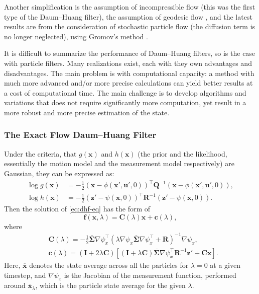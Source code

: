 Another simplification is the assumption of incompressible flow \cite{Daum2007}  (this was the first type of the Daum--Huang filter), the assumption of geodesic flow \cite{Daum2013}, and the latest results are from the consideration of stochastic particle flow (the diffusion term is no longer neglected), using Gromov's method \cite{Daum2018,Dai2021}.

It is difficult to summarize the performance of Daum--Huang filters, so is the case with particle filters. Many realizations exist, each with they own advantages and disadvantages. The main problem is with computational capacity: a method with much more advanced and/or more precise calculations can yield better results at a cost of computational time. The main challenge is to develop algorithms and variations that does not require significantly more computation, yet result in a more robust and more precise estimation of the state.

\subsubsection{The Exact Flow Daum--Huang Filter}

Under the criteria, that $g(\mathbf{x})$ and $h(\mathbf{x})$ (the prior and the likelihood, essentially the motion model and the measurement model respectively) are Gaussian,
they can be expressed as:
\begin{align}
  \log g(\mathbf{x}) & =-\frac{1}{2}(\mathbf{x}-\phi(\mathbf{x}',\mathbf{u}',0))^{\top} \mathbf{Q}^{-1}(\mathbf{x}-\phi(\mathbf{x}',\mathbf{u}',0)),            \\
  \log h(\mathbf{x}) & =-\frac{1}{2}(\mathbf{z}'-\psi(\mathbf{x},0))^{\top} \mathbf{R}^{-1}(\mathbf{z}'-\psi(\mathbf{x},0)). \label{eq:explicit-log-likelihood}
\end{align}
Then the solution of \eqref{eq:dhf-eq} has the form of
\begin{equation}\label{eq:edh-flow-vector}
  \mathbf{f}(\mathbf{x},\lambda) = \mathbf{C}(\lambda)\mathbf{x} + \mathbf{c}(\lambda),
\end{equation}
where
\begin{align}
   & \mathbf{C}(\lambda) = -\frac{1}{2}\mathbf{\mathbf{\overline\Sigma}}\nabla \psi_x^\top\left(\lambda \nabla \psi_x\mathbf{\overline\Sigma}\nabla \psi_x^\top + \mathbf{R}\right)^{-1}\nabla \psi_x,\label{eq:edh-C}                              \\
   & \mathbf{c}(\lambda) = \left(\mathbf{I}+2\lambda\mathbf{C}\right)\left[\left(\mathbf{I}+\lambda\mathbf{C}\right)\mathbf{\overline\Sigma}\nabla \psi_x^\top\mathbf{R}^{-1}\mathbf{z}' + \mathbf{C}\overline{\mathbf{x}}\right]. \label{eq:edh-c}
\end{align}
Here, $\overline{\mathbf{x}}$ denotes the state average across all the particles for $\lambda = 0$ at a given timestep,
and $\nabla \psi_x$ is the Jacobian of the measurement function, performed around $\overline{\mathbf{x}}_\lambda$,
which is the particle state average for the given $\lambda$.

